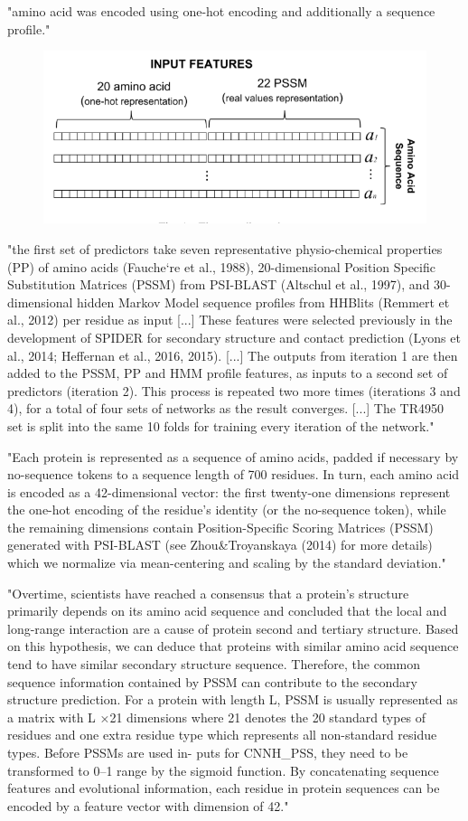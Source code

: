 \documentclass[]{scrartcl}
\begin{document}
"amino acid was encoded using one-hot encoding and additionally a sequence profile." \cite{Jurtz2017}
\begin{figure}[h]
	\centering
	\includegraphics[width=0.7\linewidth]{features}
	\label{fig:features}
\end{figure}
"the first set of predictors take seven representative physio-chemical properties (PP) of amino acids (Fauche`re et al., 1988), 20-dimensional Position Specific Substitution Matrices (PSSM) from PSI-BLAST (Altschul et al., 1997), and 30-dimensional hidden Markov Model sequence profiles from HHBlits (Remmert et al., 2012) per residue as input [...] These features were selected previously in the development of SPIDER for secondary structure and contact prediction (Lyons et al., 2014; Heffernan et al., 2016, 2015). [...] The outputs from iteration 1 are then added to the PSSM, PP and HMM profile features, as inputs to a second set of predictors (iteration 2). This process is repeated two more times (iterations 3 and 4), for a total of four sets of networks as the result converges. [...] The TR4950 set is split into the same 10 folds for training every iteration of the network." \cite{Heffernan2017}

"Each protein is represented as a sequence of amino
acids, padded if necessary by no-sequence tokens to a sequence length of 700 residues. In turn, each amino acid is encoded as a 42-dimensional vector: the first twenty-one dimensions represent the one-hot encoding of the residue’s identity (or the no-sequence token), while the remaining dimensions contain Position-Specific Scoring Matrices (PSSM) generated with PSI-BLAST (see Zhou\&Troyanskaya (2014) for more details) which we normalize via mean-centering and scaling by the standard deviation." \cite{Busia2017}

"Overtime, scientists have reached a consensus that a protein’s structure primarily depends on its amino acid sequence and concluded that the local and long-range interaction are a cause of protein second and tertiary structure. Based on this hypothesis, we can deduce that proteins with similar amino acid sequence tend to have similar secondary structure sequence. Therefore, the common sequence information contained by PSSM can contribute to the secondary structure prediction. For a protein with length L, PSSM is usually represented as a matrix with L ×21 dimensions where 21 denotes the 20 standard types of residues and one extra residue type which represents all non-standard residue types. Before PSSMs are used in- puts for CNNH\_PSS, they need to be transformed to 0–1 range by the sigmoid function. By concatenating sequence features and evolutional information, each residue in protein sequences can be encoded by a feature vector with dimension of 42." \cite{Zhou2018}
\end{document}
